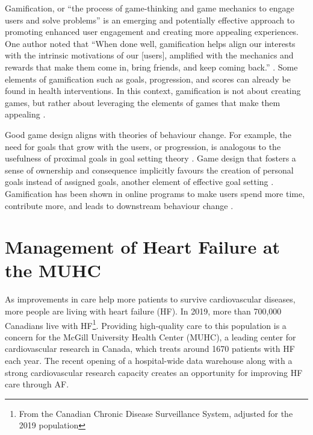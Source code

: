 Gamification, or ``the process of game-thinking and game mechanics to engage users and solve problems'' \cite{zichermann2011gamification} is an emerging and potentially effective approach to promoting enhanced user engagement and creating more appealing experiences. One author noted that ``When done well, gamification helps align our interests with the intrinsic motivations of our [users], amplified with the mechanics and rewards that make them come in, bring friends, and keep coming back.'' \cite{zichermann2011gamification}. Some elements of gamification such as goals, progression, and scores can already be found in health interventions. In this context, gamification is not about creating games, but rather about leveraging the elements of games that make them appealing \cite{deterding2011game}.

Good game design aligns with theories of behaviour change. For example, the need for goals that grow with the users, or progression, is analogous to the usefulness of proximal goals in goal setting theory \cite{locke2002building}. Game design that fosters a sense of ownership and consequence implicitly favours the creation of personal goals instead of assigned goals, another element of effective goal setting \cite{locke1990theory}. Gamification has been shown in online programs to make users spend more time, contribute more, and leads to downstream behaviour change \cite{looyestyn2017does}.

\section{Management of Heart Failure at the MUHC}
As improvements in care help more patients to survive cardiovascular diseases, more people are living with heart failure (\gls{HF}). In 2019, more than 700,000 Canadians live with \gls{HF}\footnote{From the Canadian Chronic Disease Surveillance System, adjusted for the 2019 population}. Providing high-quality care to this population is a concern for the McGill University Health Center (\gls{MUHC}), a leading center for cardiovascular research in Canada, which treats around 1670 patients with \gls{HF} each year. The recent opening of a hospital-wide data warehouse along with a strong cardiovascular research capacity creates an opportunity for improving \gls{HF} care through \gls{AF}.



